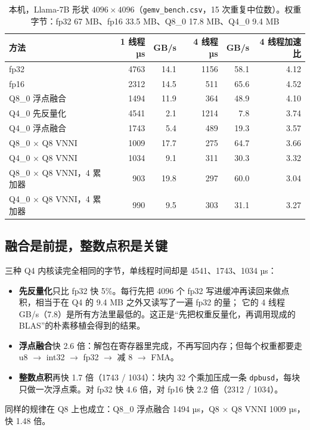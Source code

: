 \documentclass[11pt,a4paper]{ctexart}
\begin{document}
\begin{table}[H]
\centering\small
\caption{本机，Llama-7B 形状 $4096\times4096$（\texttt{gemv\_bench.csv}，15 次重复中位数）。权重字节：fp32 67 MB、fp16 33.5 MB、Q8\_0 17.8 MB、Q4\_0 9.4 MB}\label{tab:gemv-local}
\begin{tabular}{lrrrrr}
\toprule
方法 & 1 线程 µs & GB/s & 4 线程 µs & GB/s & 4 线程加速比 \\
\midrule
fp32 & 4763 & 14.1 & 1156 & 58.1 & 4.12 \\
fp16 & 2312 & 14.5 & 511 & 65.6 & 4.52 \\
Q8\_0 浮点融合 & 1494 & 11.9 & 364 & 48.9 & 4.10 \\
Q4\_0 先反量化 & 4541 & 2.1 & 1214 & 7.8 & 3.74 \\
Q4\_0 浮点融合 & 1743 & 5.4 & 489 & 19.3 & 3.57 \\
Q8\_0 × Q8 VNNI & 1009 & 17.7 & 275 & 64.7 & 3.66 \\
Q4\_0 × Q8 VNNI & 1034 & 9.1 & 311 & 30.3 & 3.32 \\
Q8\_0 × Q8 VNNI，4 累加器 & 903 & 19.8 & 297 & 60.0 & 3.04 \\
Q4\_0 × Q8 VNNI，4 累加器 & 990 & 9.5 & 303 & 31.1 & 3.27 \\
\bottomrule
\end{tabular}
\end{table}

\subsection{融合是前提，整数点积是关键}

三种 Q4 内核读完全相同的字节，单线程时间却是 4541、1743、1034 µs：
\begin{itemize}
  \item \textbf{先反量化}只比 fp32 快 5\%。每行先把 4096 个 fp32 写进缓冲再读回来做点积，相当于在 Q4 的 9.4 MB 之外又读写了一遍 fp32 的量；
        它的 4 线程 GB/s（7.8）是所有方法里最低的。这正是“先把权重反量化，再调用现成的 BLAS”的朴素移植会得到的结果。
  \item \textbf{浮点融合}快 2.6 倍：解包在寄存器里完成，不再写回内存；但每个权重都要走 u8 $\to$ int32 $\to$ fp32 $\to$ 减 8 $\to$ FMA。
  \item \textbf{整数点积}再快 1.7 倍（1743 / 1034）：块内 32 个乘加压成一条 \texttt{dpbusd}，每块只做一次浮点乘。对 fp32 快 4.6 倍，对 fp16 快 2.2 倍（2312 / 1034）。
\end{itemize}
同样的规律在 Q8 上也成立：Q8\_0 浮点融合 1494 µs，Q8 × Q8 VNNI 1009 µs，快 1.48 倍。
\end{document}

